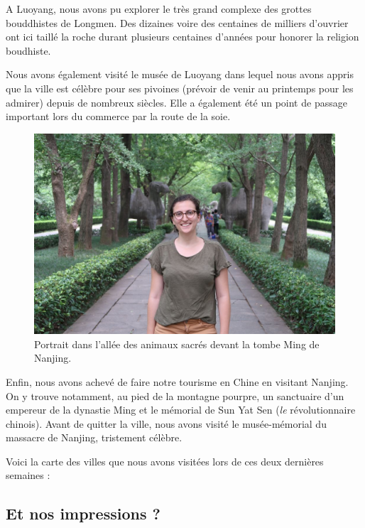 A Luoyang, nous avons pu explorer le très grand complexe des grottes
bouddhistes de Longmen. Des dizaines voire des centaines de milliers
d'ouvrier ont ici taillé la roche durant plusieurs centaines d'années
pour honorer la religion boudhiste.

Nous avons également visité le musée de Luoyang dans lequel nous avons
appris que la ville est célèbre pour ses pivoines (prévoir de venir au
printemps pour les admirer) depuis de nombreux siècles. Elle a également
été un point de passage important lors du commerce par la route de la
soie.

\begin{figure}
\centering
\includegraphics{images/20180622_nanjing.JPG}
\caption{Portrait dans l'allée des animaux sacrés devant la tombe Ming
de Nanjing.}
\end{figure}

Enfin, nous avons achevé de faire notre tourisme en Chine en visitant
Nanjing. On y trouve notamment, au pied de la montagne pourpre, un
sanctuaire d'un empereur de la dynastie Ming et le mémorial de Sun Yat
Sen (\emph{le} révolutionnaire chinois). Avant de quitter la ville, nous
avons visité le musée-mémorial du massacre de Nanjing, tristement
célèbre.

Voici la carte des villes que nous avons visitées lors de ces deux
dernières semaines :

\hypertarget{mapid}{}

\hypertarget{et-nos-impressions}{%
\subsection{Et nos impressions ?}\label{et-nos-impressions}}

